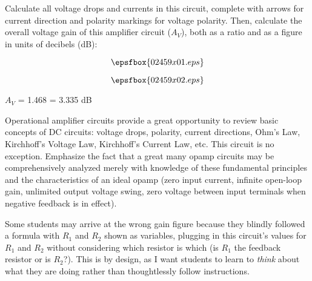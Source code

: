 

Calculate all voltage drops and currents in this circuit, complete with arrows for current direction and polarity markings for voltage polarity.  Then, calculate the overall voltage gain of this amplifier circuit ($A_V$), both as a ratio and as a figure in units of decibels (dB):

$$\epsfbox{02459x01.eps}$$







$$\epsfbox{02459x02.eps}$$

$A_V$ = 1.468 = 3.335 dB







Operational amplifier circuits provide a great opportunity to review basic concepts of DC circuits: voltage drops, polarity, current directions, Ohm's Law, Kirchhoff's Voltage Law, Kirchhoff's Current Law, etc.  This circuit is no exception.  Emphasize the fact that a great many opamp circuits may be comprehensively analyzed merely with knowledge of these fundamental principles and the characteristics of an ideal opamp (zero input current, infinite open-loop gain, unlimited output voltage swing, zero voltage between input terminals when negative feedback is in effect).

Some students may arrive at the wrong gain figure because they blindly followed a formula with $R_1$ and $R_2$ shown as variables, plugging in this circuit's values for $R_1$ and $R_2$ without considering which resistor is which (is $R_1$ the feedback resistor or is $R_2$?).  This is by design, as I want students to learn to {\it think} about what they are doing rather than thoughtlessly follow instructions.





